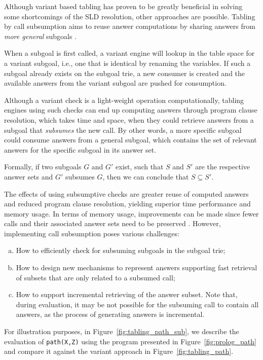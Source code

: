 Although variant based tabling has proven to be greatly beneficial in solving some shortcomings of the SLD resolution,
other approaches are possible. Tabling by call subsumption aims to reuse answer computations by sharing answers from
\textit{more general} subgoals \cite{Johnson-99}.

When a subgoal is first called, a variant engine will lookup in the table space for a variant subgoal, i.e.,
one that is identical by renaming the variables. If such a subgoal already exists on the subgoal trie, a new
consumer is created and the available answers from the variant subgoal are pushed for consumption.

Although a variant check is a light-weight operation computationally,
tabling engines using such checks can end up computing answers through program clause resolution, which takes time and space,
when they could retrieve answers from a subgoal that \textit{subsumes} the new call. By other words, a more specific subgoal
could consume answers from a general subgoal, which contains the set of relevant answers for the specific subgoal in
its answer set.

Formally, if two subgoals $G$ and $G'$ exist, such that $S$ and $S'$ are the respective answer sets and
$G'$ subsumes $G$, then we can conclude that $S \subseteq S'$.

The effects of using subsumptive checks are greater reuse of computed answers and reduced program clause resolution, yielding
superior time performance and memory usage. In terms of memory usage, improvements can be made since fewer calls and their
associated answer sets need to be preserved \cite{Johnson-99}. However, implementing call subsumption poses various challenges:

\begin{enumerate}[(a)]
\item How to efficiently check for subsuming subgoals in the subgoal trie;
\item How to design new mechanisms to represent answers supporting fast retrieval of subsets that are only related to a subsumed call;
\item How to support incremental retrieving of the answer subset. Note that, during evaluation, it may be not possible for
the subsuming call to contain all answers, as the process of generating answers is incremental.
\end{enumerate}

For illustration purposes, in Figure~\ref{fig:tabling_path_sub}, we describe the evaluation of \texttt{path(X,Z)}
using the program presented in Figure~\ref{fig:prolog_path}
and compare it against the variant approach in Figure~\ref{fig:tabling_path}.

